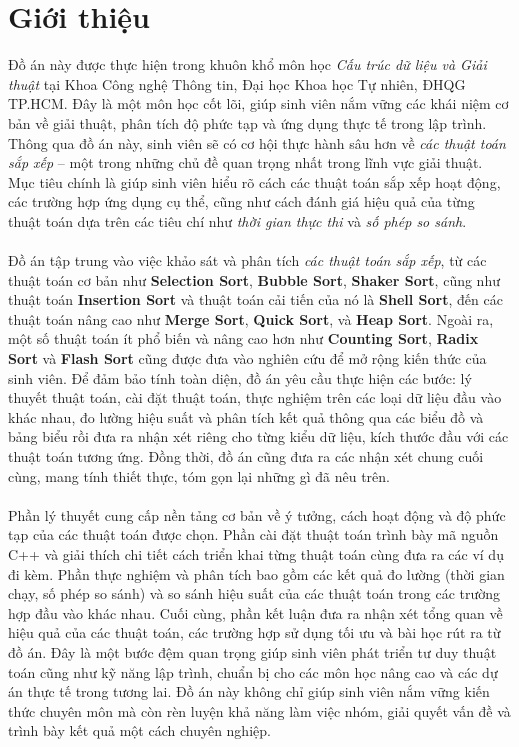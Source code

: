 \section{Giới thiệu}

Đồ án này được thực hiện trong khuôn khổ môn học \textit{Cấu trúc dữ liệu 
và Giải thuật} tại Khoa Công nghệ Thông tin, Đại học Khoa học Tự nhiên, 
ĐHQG TP.HCM. Đây là một môn học cốt lõi, giúp sinh viên nắm vững các 
khái niệm cơ bản về giải thuật, phân tích độ phức tạp và ứng dụng 
thực tế trong lập trình. Thông qua đồ án này, sinh viên sẽ có cơ hội 
thực hành sâu hơn về \textit{các thuật toán sắp xếp} – một trong những chủ đề 
quan trọng nhất trong lĩnh vực giải thuật. Mục tiêu chính là giúp 
sinh viên hiểu rõ cách các thuật toán sắp xếp hoạt động, các trường hợp 
ứng dụng cụ thể, cũng như cách đánh giá hiệu quả của từng thuật toán 
dựa trên các tiêu chí như \textit{thời gian thực thi} và \textit{số phép so sánh}.
\\\\
Đồ án tập trung vào việc khảo sát và phân tích \textit{các thuật toán sắp xếp}, 
từ các thuật toán cơ bản như \textbf{Selection Sort}, \textbf{Bubble Sort}, 
\textbf{Shaker Sort}, cũng như thuật toán \textbf{Insertion Sort} và 
thuật toán cải tiến của nó là \textbf{Shell Sort}, đến các thuật toán 
nâng cao như \textbf{Merge Sort}, \textbf{Quick Sort}, và \textbf{Heap Sort}. 
Ngoài ra, một số thuật toán ít phổ biến và nâng cao hơn như 
\textbf{Counting Sort}, \textbf{Radix Sort} và \textbf{Flash Sort} 
cũng được đưa vào nghiên cứu để mở rộng kiến thức của sinh viên. Để 
đảm bảo tính toàn diện, đồ án yêu cầu thực hiện các bước: lý thuyết 
thuật toán, cài đặt thuật toán, thực nghiệm trên các loại dữ liệu 
đầu vào khác nhau, đo lường hiệu suất và phân tích kết quả thông qua 
các biểu đồ và bảng biểu rồi đưa ra nhận xét riêng cho từng kiểu dữ liệu, 
kích thước đầu với các thuật toán tương ứng. Đồng thời, đồ án cũng 
đưa ra các nhận xét chung cuối cùng, mang tính thiết thực, tóm gọn 
lại những gì đã nêu trên.
\\\\
Phần lý thuyết cung cấp nền tảng cơ bản về ý tưởng, cách hoạt động và 
độ phức tạp của các thuật toán được chọn. Phần cài đặt thuật toán 
trình bày mã nguồn C++ và giải thích chi tiết cách triển khai từng 
thuật toán cùng đưa ra các ví dụ đi kèm. Phần thực nghiệm và phân tích 
bao gồm các kết quả đo lường (thời gian chạy, số phép so sánh) và so sánh 
hiệu suất của các thuật toán trong các trường hợp đầu vào khác nhau. 
Cuối cùng, phần kết luận đưa ra nhận xét tổng quan về hiệu quả của các 
thuật toán, các trường hợp sử dụng tối ưu và bài học rút ra từ đồ án. 
Đây là một bước đệm quan trọng giúp sinh viên phát triển tư duy thuật toán 
cũng như kỹ năng lập trình, chuẩn bị cho các môn học nâng cao và các dự án 
thực tế trong tương lai. Đồ án này không chỉ giúp sinh viên nắm vững 
kiến thức chuyên môn mà còn rèn luyện khả năng làm việc nhóm, giải quyết 
vấn đề và trình bày kết quả một cách chuyên nghiệp.